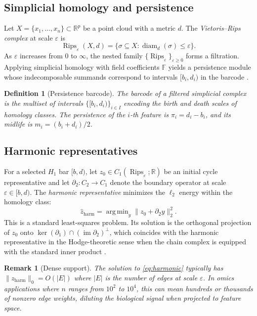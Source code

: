 \documentclass[11pt]{article}
\newtheorem{definition}[theorem]{Definition}
\newtheorem{remark}[theorem]{Remark}
\DeclareMathOperator{\Rips}{Rips}
\DeclareMathOperator{\diam}{diam}
\DeclareMathOperator*{\argmin}{arg\,min}
\begin{document}
\subsection{Simplicial homology and persistence}

Let $X = \{x_1, \ldots, x_n\} \subset \mathbb{R}^p$ be a point cloud with a metric $d$.
The \emph{Vietoris--Rips complex} at scale $\varepsilon$ is
\[
\Rips_\varepsilon(X, d) = \bigl\{ \sigma \subseteq X : \diam_d(\sigma) \le \varepsilon \bigr\}.
\]
As $\varepsilon$ increases from $0$ to $\infty$, the nested family $\{\Rips_\varepsilon\}_{\varepsilon \ge 0}$ forms a filtration.
Applying simplicial homology with field coefficients $\mathbb{F}$ yields a persistence module whose indecomposable summands correspond to intervals $[b_i, d_i)$ in the barcode \cite{zomorodian2005}.

\begin{definition}[Persistence barcode]
The \emph{barcode} of a filtered simplicial complex is the multiset of intervals $\{[b_i, d_i)\}_{i \in I}$ encoding the birth and death scales of homology classes.
The \emph{persistence} of the $i$-th feature is $\pi_i = d_i - b_i$, and its \emph{midlife} is $m_i = (b_i + d_i)/2$.
\end{definition}

\subsection{Harmonic representatives}

For a selected $H_1$ bar $[b, d)$, let $z_0 \in C_1(\Rips_\varepsilon; \mathbb{R})$ be an initial cycle representative and let $\partial_2 : C_2 \to C_1$ denote the boundary operator at scale $\varepsilon \in [b, d)$.
The \emph{harmonic representative} minimizes the $\ell_2$ energy within the homology class:
\begin{equation}\label{eq:harmonic}
\hat{z}_{\mathrm{harm}} = \argmin_{y} \| z_0 + \partial_2 y \|_2^2.
\end{equation}
This is a standard least-squares problem.
Its solution is the orthogonal projection of $z_0$ onto $\ker(\partial_1) \cap (\operatorname{im} \partial_2)^\perp$, which coincides with the harmonic representative in the Hodge-theoretic sense when the chain complex is equipped with the standard inner product \cite{harmonicPH, friedman1998}.

\begin{remark}[Dense support]
The solution to \eqref{eq:harmonic} typically has $\|\hat{z}_{\mathrm{harm}}\|_0 = O(|E|)$ where $|E|$ is the number of edges at scale $\varepsilon$.
In omics applications where $n$ ranges from $10^2$ to $10^4$, this can mean hundreds or thousands of nonzero edge weights, diluting the biological signal when projected to feature space.
\end{remark}
\end{document}
